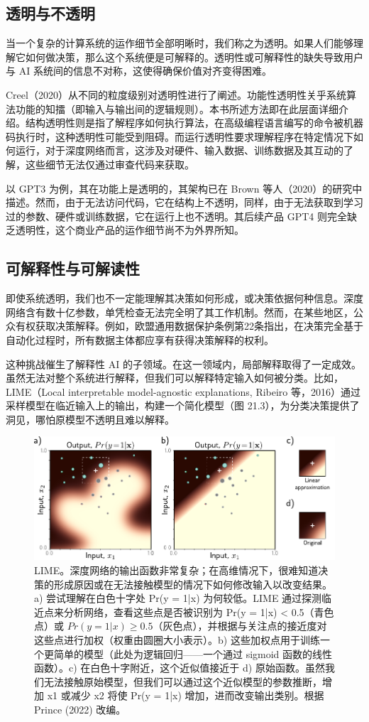 \documentclass[lang=cn,newtx,10pt,scheme=chinese]{elegantbook}
\begin{document}
\subsection{透明与不透明}
当一个复杂的计算系统的运作细节全部明晰时，我们称之为透明。如果人们能够理解它如何做决策，那么这个系统便是可解释的。透明性或可解释性的缺失导致用户与 AI 系统间的信息不对称，这使得确保价值对齐变得困难。

Creel（2020）从不同的粒度级别对透明性进行了阐述。功能性透明性关乎系统算法功能的知擂（即输入与输出间的逻辑规则）。本书所述方法即在此层面详细介绍。结构透明性则是指了解程序如何执行算法，在高级编程语言编写的命令被机器码执行时，这种透明性可能受到阻碍。而运行透明性要求理解程序在特定情况下如何运行，对于深度网络而言，这涉及对硬件、输入数据、训练数据及其互动的了解，这些细节无法仅通过审查代码来获取。

以 GPT3 为例，其在功能上是透明的，其架构已在 Brown 等人（2020）的研究中描述。然而，由于无法访问代码，它在结构上不透明，同样，由于无法获取到学习过的参数、硬件或训练数据，它在运行上也不透明。其后续产品 GPT4 则完全缺乏透明性，这个商业产品的运作细节尚不为外界所知。

\subsection{可解释性与可解读性}
即使系统透明，我们也不一定能理解其决策如何形成，或决策依据何种信息。深度网络含有数十亿参数，单凭检查无法完全明了其工作机制。然而，在某些地区，公众有权获取决策解释。例如，欧盟通用数据保护条例第22条指出，在决策完全基于自动化过程时，所有数据主体都应享有获得决策解释的权利。

这种挑战催生了解释性 AI 的子领域。在这一领域内，局部解释取得了一定成效。虽然无法对整个系统进行解释，但我们可以解释特定输入如何被分类。比如，LIME（Local interpretable model-agnostic explanations, Ribeiro 等，2016）通过采样模型在临近输入上的输出，构建一个简化模型（图 21.3），为分类决策提供了洞见，哪怕原模型不透明且难以解释。

\begin{figure}[ht!]
\centering
\includegraphics[width=0.7\linewidth]{PDFFigures/UDLChap20PDF/EthicsLIME.pdf}
\caption{LIME。深度网络的输出函数非常复杂；在高维情况下，很难知道决策的形成原因或在无法接触模型的情况下如何修改输入以改变结果。a) 尝试理解在白色十字处 Pr(y = 1|x) 为何较低。LIME 通过探测临近点来分析网络，查看这些点是否被识别为 Pr(y = 1|x) < 0.5（青色点）或 \(Pr(y = 1|x) \geq 0.5\)（灰色点），并根据与关注点的接近度对这些点进行加权（权重由圆圈大小表示）。b) 这些加权点用于训练一个更简单的模型（此处为逻辑回归——一个通过 sigmoid 函数的线性函数）。c) 在白色十字附近，这个近似值接近于 d) 原始函数。虽然我们无法接触原始模型，但我们可以通过这个近似模型的参数推断，增加 x1 或减少 x2 将使 Pr(y = 1|x) 增加，进而改变输出类别。根据 Prince (2022) 改编。}
\end{figure}
\end{document}
